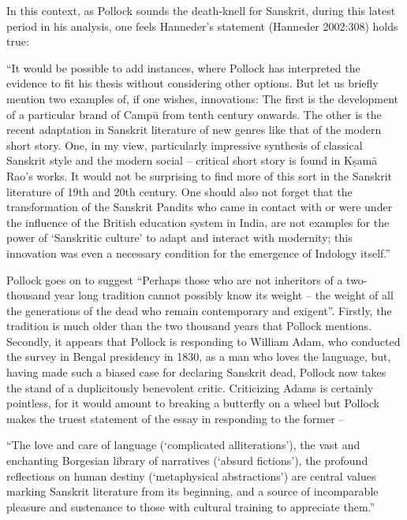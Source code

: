 In this context, as Pollock sounds the death-knell for Sanskrit, during this latest period in his analysis, one feels Hanneder’s statement (Hanneder 2002:308) holds true:

\begin{myquote}
“It would be possible to add instances, where Pollock has interpreted the evidence to fit his thesis without considering other options. But let us briefly mention two examples of, if one wishes, innovations: The first is the development of a particular brand of Campū from tenth century onwards. The other is the recent adaptation in Sanskrit literature of new genres like that of the modern short story. One, in my view, particularly impressive synthesis of classical Sanskrit style and the modern social – critical short story is found in Kṣamā Rao’s works. It would not be surprising to find more of this sort in the Sanskrit literature of 19th and 20th century. One should also not forget that the transformation of the Sanskrit Pandits who came in contact with or were under the influence of the British education system in India, are not examples for the power of ‘Sanskritic culture’ to adapt and interact with modernity; this innovation was even a necessary condition for the emergence of Indology itself.”
\end{myquote}

Pollock goes on to suggest “Perhaps those who are not inheritors of a two-thousand year long tradition cannot possibly know its weight – the weight of all the generations of the dead who remain contemporary and exigent”. Firstly, the tradition is much older than the two thousand years that Pollock mentions. Secondly, it appears that Pollock is responding to William Adam, who conducted the survey in Bengal presidency in 1830, as a man who loves the language, but, having made such a biased case for declaring Sanskrit dead, Pollock now takes the stand of a duplicitously benevolent critic. Criticizing Adams is certainly pointless, for it would amount to breaking a butterfly on a wheel but Pollock makes the truest statement of the essay in responding to the former – 

\begin{myquote}
“The love and care of language (‘complicated alliterations’), the vast and enchanting  Borgesian library of narratives (‘absurd fictions’), the profound reflections on human destiny (‘metaphysical abstractions’) are central values marking Sanskrit literature from its beginning, and a source of incomparable pleasure and sustenance to those with cultural training to appreciate them.”
\end{myquote}

